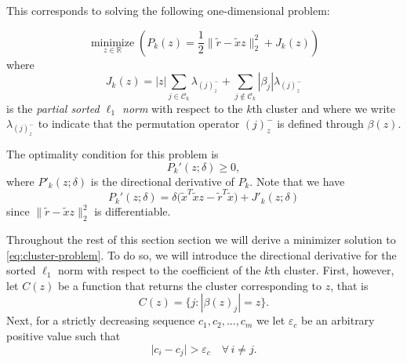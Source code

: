 This corresponds to solving the following
one-dimensional problem:

\begin{equation}
  \label{eq:cluster-problem}
  \operatorname*{minimize}_{z \in \mathbb{R}} \left(P_k(z) = \frac{1}{2} \lVert \tilde r - \tilde x z \rVert_2^2 + J_k(z)\right)
\end{equation}
where
\[
  J_k(z) = |z| \sum_{j \in \mathcal{C}_k} \lambda_{(j)^-_z}
  + \sum_{j \notin \mathcal{C}_k} |\beta_j| \lambda_{(j)^-_z}
\]
is the \emph{partial sorted \(\ell_1\) norm} with respect to the \(k\)th cluster and
where we write \(\lambda_{(j)^-_z}\) to indicate that the permutation operator \((j)^-_z\)
is defined through \(\beta(z)\).

The optimality condition for this problem is
\[
  P_k'(z; \delta) \geq 0,
\]
where \(P'_k(z; \delta)\) is the directional derivative of \(P_k\).
Note that we have
\[
  P_k'(z; \delta) = \delta\big(\tilde x^T \tilde x z - \tilde r^T \tilde x\big) + J'_k(z; \delta)
\]
since \(\lVert \tilde{r} - \tilde{x}z\rVert_2^2\) is differentiable.


Throughout the rest of this section section we will derive a minimizer solution to
\eqref{eq:cluster-problem}. To do so, we will introduce the directional derivative for the
sorted \(\ell_1\) norm with respect to the coefficient of the \(k\)th cluster. First,
however, let \(C(z)\) be a function that returns the cluster corresponding to \(z\), that is
\[
  C(z) = \{j : |\beta(z)_j| = z\}.
\]
Next, for a  strictly decreasing sequence \(c_1, c_2, ..., c_m\) we let $\varepsilon_c$ be an arbitrary positive value such that
\begin{equation}
  \label{eq:epsilon-c}
  \big| c_i - c_j\big| > {\varepsilon_c} \quad \forall\, i \neq j.
\end{equation}

